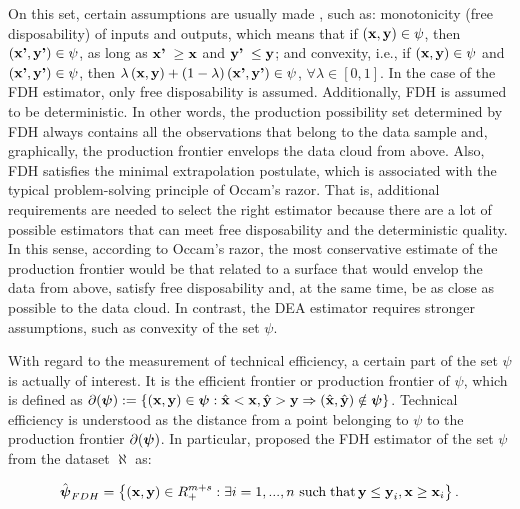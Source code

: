 On this set, certain assumptions are usually made
\citep[see,][]{fare1995}, such as: monotonicity (free disposability) of
inputs and outputs, which means that if
\(({\it \textbf{x},\textbf{y}})\in \psi\), then
\(({\it \textbf{x'},\textbf{y'}})\in \psi\), as long as
\({\it \textbf{x'}\; }\ge {\it \textbf{x}}\) and
\({\it \textbf{y'}\; }\le {\it \textbf{y}}\); and convexity, i.e., if
\(\left({\it \textbf{x}},{\it \textbf{y}}\right)\in \psi\) and
\(\left({\it \textbf{x'}},{\it \textbf{y'}}\right)\in \psi\), then
\(\lambda \left({\it \textbf{x}},{\it \textbf{y}}\right)+\left(1-\lambda \right)\left({\it \textbf{x'}},{\it \textbf{y'}}\right)\in \psi\),
\(\forall \lambda \in \left[0,1\right]\). In the case of the FDH
estimator, only free disposability is assumed. Additionally, FDH is
assumed to be deterministic. In other words, the production possibility
set determined by FDH always contains all the observations that belong
to the data sample and, graphically, the production frontier envelops
the data cloud from above. Also, FDH satisfies the minimal extrapolation
postulate, which is associated with the typical problem-solving
principle of Occam's razor. That is, additional requirements are needed
to select the right estimator because there are a lot of possible
estimators that can meet free disposability and the deterministic
quality. In this sense, according to Occam's razor, the most
conservative estimate of the production frontier would be that related
to a surface that would envelop the data from above, satisfy free
disposability and, at the same time, be as close as possible to the data
cloud. In contrast, the DEA estimator requires stronger assumptions,
such as convexity of the set \(\psi\).

With regard to the measurement of technical efficiency, a certain part
of the set \(\psi\) is actually of interest. It is the efficient
frontier or production frontier of \(\psi\), which is defined as
\(\partial ({\it \boldsymbol{\psi}}):=\left\{({\it \textbf{x}},{\it \textbf{y}})\in {\it \boldsymbol{\psi}}:\hat{{\it \textbf{x}}}<{\it \textbf{x}},\hat{{\it \textbf{y}}}>{\it \textbf{y}}\Rightarrow (\hat{{\it \textbf{x}}},\hat{{\it \textbf{y}}})\notin {\it \boldsymbol{\psi}}\right\}\).
Technical efficiency is understood as the distance from a point
belonging to \(\psi\) to the production frontier
\(\partial ({\it \boldsymbol{\psi}})\). In particular,
\citet{deprins1984} proposed the FDH estimator of the set \(\psi\) from
the dataset \(\aleph\) as:

\begin{equation} \label{(2)} 
\hat{{\it \boldsymbol{\psi}}}_{FDH} =\left\{\left({\it \textbf{x}},{\it \textbf{y}}\right)\in R_{+}^{m+s} :\exists i=1,...,n\, \, {\rm such\; that}\, {\it \textbf{y}}\le {\it \textbf{y}}_{i} ,{\it \textbf{x}}\ge {\it \textbf{x}}_{i} \right\}. 
\end{equation}

